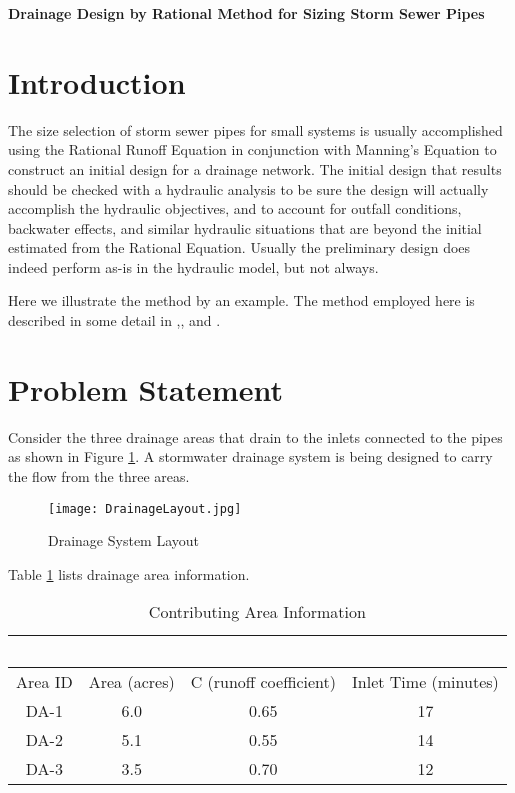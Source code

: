 \documentclass[12pt]{article}
\begin{document}
\begingroup
\begin{center}
{\textbf{Drainage Design by Rational Method for Sizing Storm Sewer Pipes }}
\end{center}
\endgroup
\section*{Introduction}
The size selection of storm sewer pipes for small systems is usually accomplished using the Rational Runoff Equation in conjunction with Manning's Equation to construct an initial design for a drainage network.  
The initial design that results should be checked with a hydraulic analysis to be sure the design will actually accomplish the hydraulic objectives, and to account for outfall conditions, backwater effects, and similar hydraulic situations that are beyond the initial estimated from the Rational Equation.
Usually the preliminary design does indeed perform as-is in the hydraulic model, but not always.

Here we illustrate the method by an example.  
The method employed here is described in some detail in \cite{Wurbs2002},\cite{Chin2006}, and \cite{mays2011}.

\section*{Problem Statement}
\label{prob:drainDesign} Consider the three drainage areas that drain to the inlets connected to the pipes as shown in Figure \ref{fig:DrainageLayout}.  
A stormwater drainage system is being designed to carry the flow from the three areas.  
\begin{figure}[ht!] %
\centering
   \texttt{[image: DrainageLayout.jpg]}
   \caption{Drainage System Layout}
   \label{fig:DrainageLayout} 
\end{figure}
Table \ref{tab:drainageArea} lists drainage area information.\\
\begin{table}[h!]
   \centering
   \caption{Contributing Area Information}
   \begin{tabular}{c c c c} %
   ~ & ~ & ~ & \\
   \hline
   \hline
      Area ID & Area (acres) & C (runoff coefficient) & Inlet Time (minutes) \\
      \hline
      DA-1 & 6.0 & 0.65 & 17 \\
      DA-2 & 5.1 & 0.55 & 14 \\
      DA-3 & 3.5 & 0.70 & 12 \\
      \hline
      \hline
   \end{tabular}
   \label{tab:drainageArea}
\end{table}
\end{document}

